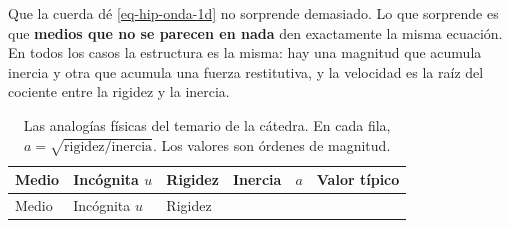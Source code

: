 \documentclass[
  spanish,
  a4paper,
]{scrbook}
\theoremstyle{definition}
\theoremstyle{plain}
\theoremstyle{definition}
\theoremstyle{plain}
\theoremstyle{definition}
\theoremstyle{remark}
\begin{document}
Que la cuerda dé \ref{eq-hip-onda-1d} no sorprende demasiado. Lo que
sorprende es que \textbf{medios que no se parecen en nada} den
exactamente la misma ecuación. En todos los casos la estructura es la
misma: hay una magnitud que acumula inercia y otra que acumula una
fuerza restitutiva, y la velocidad es la raíz del cociente entre la
rigidez y la inercia.

\begin{longtable}[]{@{}
  >{\raggedright\arraybackslash}p{}
  >{\raggedright\arraybackslash}p{}
  >{\raggedright\arraybackslash}p{}
  >{\raggedright\arraybackslash}p{}
  >{\raggedright\arraybackslash}p{}
  >{\raggedright\arraybackslash}p{}@{}}
\caption{Las analogías físicas del temario de la cátedra. En cada fila,
\(a = \sqrt{\text{rigidez}/\text{inercia}}\). Los valores son órdenes de
magnitud.}\label{tbl-hip-analogias}\tabularnewline
\toprule\noalign{}
\begin{minipage}[b]{\linewidth}\raggedright
Medio
\end{minipage} & \begin{minipage}[b]{\linewidth}\raggedright
Incógnita \(u\)
\end{minipage} & \begin{minipage}[b]{\linewidth}\raggedright
Rigidez
\end{minipage} & \begin{minipage}[b]{\linewidth}\raggedright
Inercia
\end{minipage} & \begin{minipage}[b]{\linewidth}\raggedright
\(a\)
\end{minipage} & \begin{minipage}[b]{\linewidth}\raggedright
Valor típico
\end{minipage} \\
\midrule\noalign{}
\endfirsthead
\toprule\noalign{}
\begin{minipage}[b]{\linewidth}\raggedright
Medio
\end{minipage} & \begin{minipage}[b]{\linewidth}\raggedright
Incógnita \(u\)
\end{minipage} & \begin{minipage}[b]{\linewidth}\raggedright
Rigidez
\end{minipage} & \begin{minipage}[b]{\linewidth}\raggedright

\end{minipage}
\end{longtable}
\end{document}

